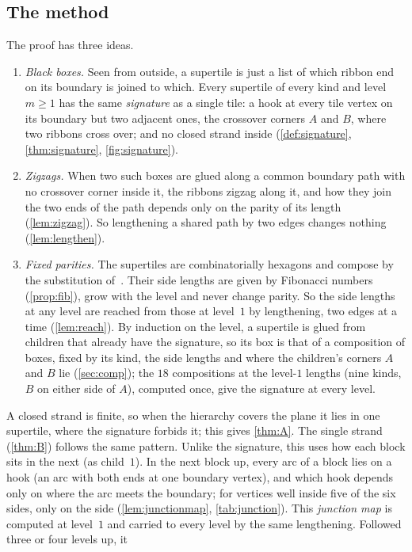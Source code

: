 \documentclass[11pt]{amsart}
\theoremstyle{definition}
\theoremstyle{remark}
\begin{document}
\subsection*{The method}
The proof has three ideas.
\begin{enumerate}[leftmargin=*]
\item \emph{Black boxes.} Seen from outside, a supertile is just a list of which ribbon end on its boundary is
joined to which. Every supertile of every kind and level $m\ge1$ has the same \emph{signature} as a single tile: a hook
at every tile vertex on its boundary but two adjacent ones, the crossover corners $A$ and $B$, where two ribbons cross
over; and no closed strand inside (\cref{def:signature}, \cref{thm:signature}, \cref{fig:signature}).
\item \emph{Zigzags.} When two such boxes are glued along a common boundary path with no crossover corner inside it,
the ribbons zigzag along it, and how they join the two ends of the path depends only on the parity of its length
(\cref{lem:zigzag}). So lengthening a shared path by two edges changes nothing (\cref{lem:lengthen}).
\item \emph{Fixed parities.} The supertiles are combinatorially hexagons and compose by the substitution
of~\cite[Fig.~5.1]{SMKGS-spectre}. Their side lengths are given by Fibonacci numbers (\cref{prop:fib}), grow with the
level and never change parity. So the side lengths at any level are reached from those at level~$1$ by lengthening,
two edges at a time (\cref{lem:reach}). By induction on the level, a supertile is glued from children that already
have the signature, so its box is that of a composition of boxes, fixed by its kind, the side lengths and where the
children's corners $A$ and $B$ lie (\cref{sec:comp}); the $18$ compositions at the level-$1$ lengths (nine kinds, $B$
on either side of $A$), computed once, give the signature at every level.
\end{enumerate}
A closed strand is finite, so when the hierarchy covers the plane it lies in one supertile, where the signature forbids
it; this gives \cref{thm:A}. The single strand (\cref{thm:B}) follows the same pattern. Unlike the signature, this
uses how each block sits in the next (as child~$1$). In the next block up, every arc of a block lies on a hook (an arc
with both ends at one boundary vertex), and which hook depends only on where the arc meets the boundary; for vertices
well inside five of the six sides, only on the side (\cref{lem:junctionmap}, \cref{tab:junction}). This \emph{junction
map} is computed at level~$1$ and carried to every level by the same lengthening. Followed three or four levels up, it
\end{document}
